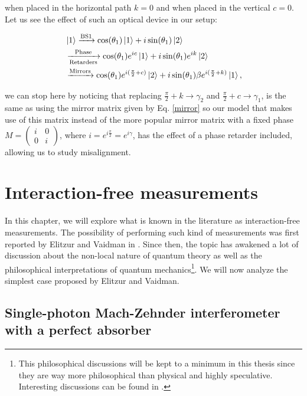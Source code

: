\documentclass[12pt]{book}
\newcommand\blankpage{
    \null
    \thispagestyle{empty}
    \addtocounter{page}{0}
    \newpage
    }
\begin{document}
when placed in the horizontal path $k=0$ and when placed in the vertical $c=0$. Let us see the effect of such an optical device in our setup:

\begin{align*}
&\ket{1}\xrightarrow{\text{BS1}}\cos(\theta_{1})\ket{1}+i\sin(\theta_{1})\ket{2}\\ &\xrightarrow[\text{Retarders}]{\text{Phase}}\cos(\theta_{1})e^{ic}\ket{1}+i\sin(\theta_{1}) e^{ik}\ket{2} \\ &\xrightarrow{\text{Mirrors}} \cos(\theta_{1})e^{i(\frac{\pi}{2}+c)}\ket{2}+i\sin(\theta_{1})\beta e^{i(\frac{\pi}{2}+k)}\ket{1},
\end{align*}

we can stop here by noticing that replacing $\frac{\pi}{2}+k\xrightarrow{}\gamma_{2}$ and  $\frac{\pi}{2}+c\xrightarrow{}\gamma_{1}$,  is the same as using the mirror matrix given by Eq. \ref{mirror} so our model that makes use of this matrix  instead of the more popular mirror matrix with a fixed phase $M=\begin{pmatrix} i & 0\\0& i\end{pmatrix}$, where $i=e^{i \frac{\pi}{2}}=e^{i\gamma}$, has the  effect of a phase retarder included, allowing us to study misalignment. 

\afterpage{\blankpage}

\chapter[Interaction-free measurements]{ Interaction-free  measurements}


In this chapter, we will explore what is known in the literature as interaction-free measurements. The possibility of performing such kind of measurements was first reported by Elitzur and Vaidman in \cite{Elitzur}. Since then, the topic has awakened a lot of discussion about the non-local nature of quantum theory as well as the philosophical interpretations of quantum mechanics\footnote{ This philosophical discussions will be kept to a minimum in this thesis since they are way more philosophical than physical and highly speculative. Interesting discussions can be found in \cite{paper_vaidman, maudlin}. }. We will now analyze the simplest case proposed by Elitzur and Vaidman.

\section[Elitzur-Vaidman's bomb detector]{Single-photon Mach-Zehnder interferometer with a perfect absorber}
\end{document}
